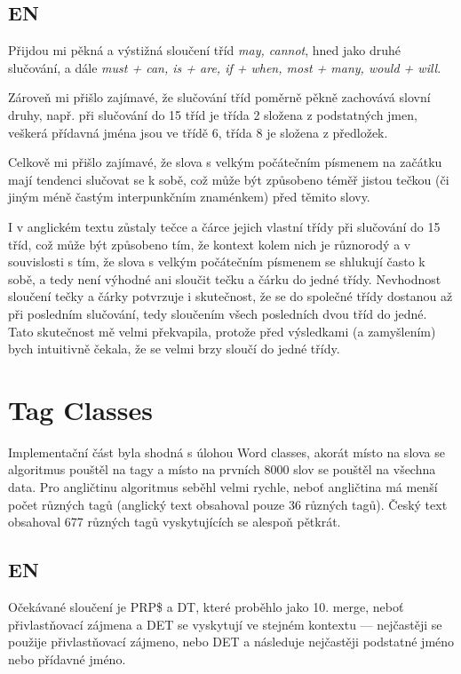 \documentclass[12pt, a4paper]{report}
\theoremstyle{remark}
\begin{document}
\subsection*{EN}

Přijdou mi pěkná a výstižná sloučení tříd {\it may, cannot}, hned jako druhé slučování,  a dále  {\it must + can, is + are, if + when, most + many, would + will}.

Zároveň mi přišlo zajímavé, že slučování tříd poměrně pěkně zachovává slovní druhy, např. při slučování do 15 tříd je třída 2 složena  z podstatných jmen, veškerá přídavná jména jsou ve třídě 6, třída 8 je složena z předložek.

Celkově mi přišlo zajímavé, že slova s velkým počátečním písmenem na začátku mají tendenci slučovat se k sobě, což může být způsobeno téměř jistou tečkou (či jiným méně častým interpunkčním znaménkem) před těmito slovy.

I v anglickém textu zůstaly tečce a čárce jejich vlastní třídy při slučování do 15 tříd, což může být způsobeno tím, že kontext kolem nich je různorodý a v souvislosti s tím, že slova s velkým počátečním písmenem se shlukují často k sobě, a tedy není výhodné ani sloučit tečku a čárku do jedné třídy. Nevhodnost sloučení tečky a čárky potvrzuje i skutečnost, že se do společné třídy dostanou až při posledním slučování, tedy sloučením všech posledních dvou tříd do jedné. Tato skutečnost mě velmi překvapila, protože před výsledkami (a zamyšlením) bych intuitivně čekala, že se velmi brzy sloučí do jedné třídy.

\section*{Tag Classes}
Implementační část byla shodná s úlohou Word classes, akorát místo na slova se algoritmus pouštěl na tagy a místo na prvních 8000 slov se pouštěl na všechna data. Pro angličtinu algoritmus seběhl velmi rychle, neboť angličtina má menší počet různých tagů (anglický text obsahoval pouze 36 různých tagů). Český text obsahoval 677 různých tagů vyskytujících se alespoň pětkrát.

\subsection*{EN}
Očekávané sloučení je PRP\$ a DT, které proběhlo jako 10. merge, neboť přivlastňovací zájmena a DET se vyskytují ve stejném kontextu --- nejčastěji se použije přivlastňovací zájmeno, nebo DET a následuje nejčastěji podstatné jméno nebo přídavné jméno. 
\end{document}

